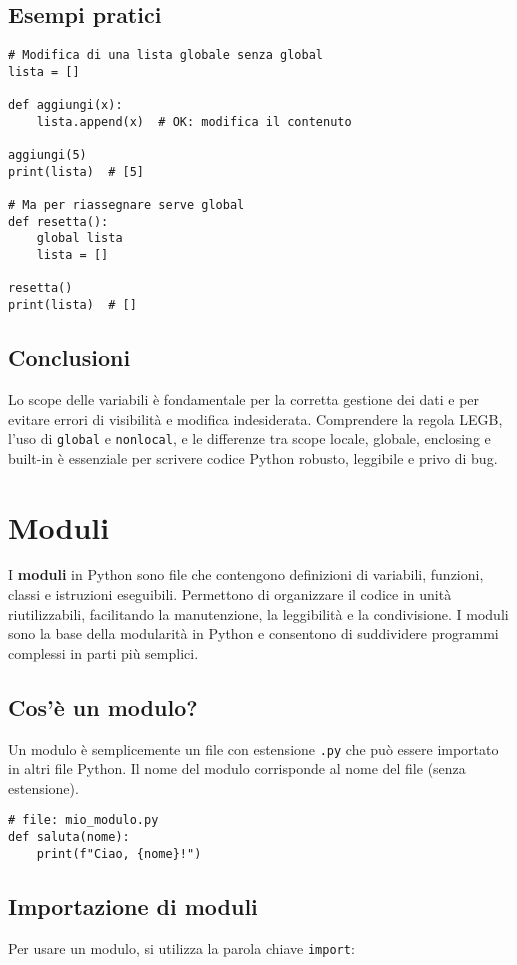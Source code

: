 \documentclass[a4paper,12pt]{article}
\begin{document}
\subsection*{Esempi pratici}
\begin{lstlisting}
# Modifica di una lista globale senza global
lista = []

def aggiungi(x):
    lista.append(x)  # OK: modifica il contenuto

aggiungi(5)
print(lista)  # [5]

# Ma per riassegnare serve global
def resetta():
    global lista
    lista = []

resetta()
print(lista)  # []
\end{lstlisting}

\subsection*{Conclusioni}
Lo scope delle variabili è fondamentale per la corretta gestione dei dati e per evitare errori di visibilità e modifica indesiderata. Comprendere la regola LEGB, l'uso di \texttt{global} e \texttt{nonlocal}, e le differenze tra scope locale, globale, enclosing e built-in è essenziale per scrivere codice Python robusto, leggibile e privo di bug.

\section{Moduli}
I \textbf{moduli} in Python sono file che contengono definizioni di variabili, funzioni, classi e istruzioni eseguibili. Permettono di organizzare il codice in unità riutilizzabili, facilitando la manutenzione, la leggibilità e la condivisione. I moduli sono la base della modularità in Python e consentono di suddividere programmi complessi in parti più semplici.

\subsection*{Cos'è un modulo?}
Un modulo è semplicemente un file con estensione \texttt{.py} che può essere importato in altri file Python. Il nome del modulo corrisponde al nome del file (senza estensione).

\begin{lstlisting}
# file: mio_modulo.py
def saluta(nome):
    print(f"Ciao, {nome}!")
\end{lstlisting}

\subsection*{Importazione di moduli}
Per usare un modulo, si utilizza la parola chiave \texttt{import}:
\end{document}
